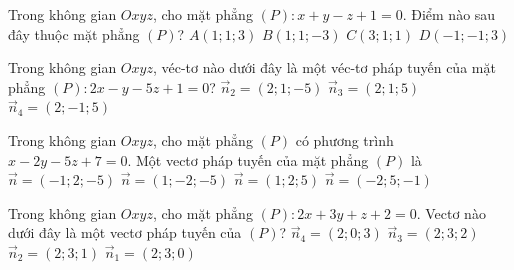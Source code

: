 \begin{ex}%
	Trong không gian $Oxyz$,  cho mặt phẳng $(P)\colon x+y-z+1=0$. Điểm nào sau đây thuộc mặt phẳng $(P)$?
	 \choice
		{\True  $A(1;1;3)$}
		{$B(1;1;-3)$} 
		{$C(3;1;1)$} 
		{$D(-1;-1;3)$} 
\end{ex}

\begin{ex}%
	Trong không gian $Oxyz$, véc-tơ nào dưới đây là một véc-tơ pháp  tuyến của mặt phẳng $(P)\colon 2x-y-5z+1=0$?
		{$\overrightarrow{n}_2=(2;1;-5)$} 
		{$\overrightarrow{n}_3=(2;1;5)$} 
		{$\overrightarrow{n}_4=(2;-1;5)$} 
\end{ex}

\begin{ex}%
	Trong  không gian $Oxyz$, cho mặt phẳng $(P)$ có phương trình $x - 2y - 5z + 7 = 0$. Một vectơ pháp tuyến của mặt phẳng $(P)$ là
	\choice 
		{$\overrightarrow{n}=(-1;2;-5)$} 
		 {\True $\overrightarrow{n}=(1;-2;-5)$}
		 {$\overrightarrow{n}=(1;2;5)$}
		 {$\overrightarrow{n}=(-2;5;-1)$}
\end{ex}

\begin{ex}%
	Trong không gian $Oxyz$,  cho mặt phẳng $(P)\colon 2x+3y+z+2=0$. Vectơ nào dưới đây là một vectơ pháp tuyến của $(P)$?
	 \choice
		{$\overrightarrow{n}_4=(2;0;3)$} 
		 {$\overrightarrow{n}_3=(2;3;2)$}
		{\True $\overrightarrow{n}_2=(2;3;1)$} 
		{$\overrightarrow{n}_1=(2;3;0)$} 
\end{ex}

